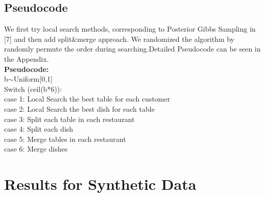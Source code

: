 \documentclass{article}
\begin{document}
\subsection{Pseudocode}
We first try local search methods, corresponding to Posterior Gibbs Sampling in [7] and then add split\&merge approach. We randomized the algorithm
by randomly permute the order during searching.Detailed Pseudocode can be seen in the Appendix.\\

{\bf Pseudocode:}\\
b$\sim$Uniform[0,1]\\
Switch (ceil(b*6)):\\
case 1: Local Search the best table for each customer\\
case 2: Local Search the best dish for each table\\
case 3: Split each table in each restaurant\\
case 4: Split each dish\\
case 5: Merge tables in each restaurant\\ 
case 6: Merge dishes\\
\section{Results for Synthetic Data}
\end{document}
